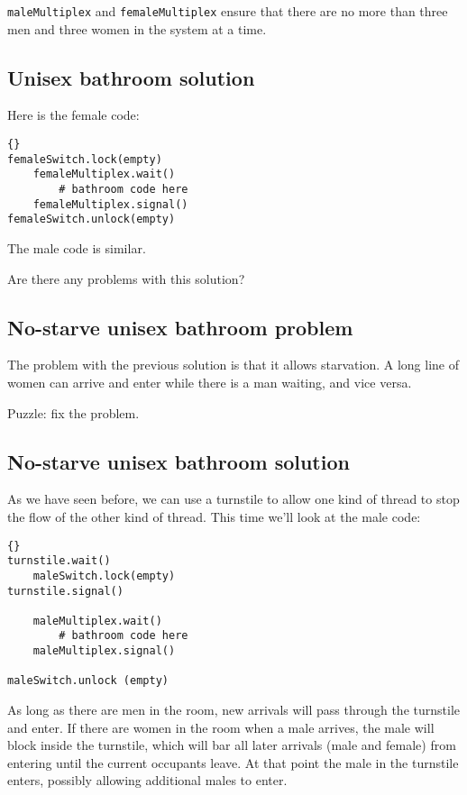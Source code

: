 \documentclass{book}
\newcommand{\clearemptydoublepage}{\newpage\cleardoublepage}
\begin{document}
{\tt maleMultiplex} and {\tt femaleMultiplex} ensure that there are no
more than three men and three women in the system at a time.


\clearemptydoublepage
\subsection {Unisex bathroom solution}

Here is the female code:

\begin{lstlisting}[title={Unisex bathroom solution (female)}]{}
femaleSwitch.lock(empty)
    femaleMultiplex.wait()
        # bathroom code here
    femaleMultiplex.signal()
femaleSwitch.unlock(empty)
\end{lstlisting}

The male code is similar.

Are there any problems with this solution?

\clearemptydoublepage
\subsection {No-starve unisex bathroom problem}

The problem with the previous solution is that it allows starvation.
A long line of women can arrive and enter while there is a man
waiting, and vice versa.

Puzzle: fix the problem.


\clearemptydoublepage
\subsection {No-starve unisex bathroom solution}

As we have seen before, we can use a turnstile to allow one
kind of thread to stop the flow of the other kind of thread.
This time we'll look at the male code:

\begin{lstlisting}[title={No-starve unisex bathroom solution (male)}]{}
turnstile.wait()
    maleSwitch.lock(empty)
turnstile.signal()

    maleMultiplex.wait()
        # bathroom code here
    maleMultiplex.signal()

maleSwitch.unlock (empty)
\end{lstlisting}

As long as there are men in the room, new arrivals will pass
through the turnstile and enter.  If there are women in the room
when a male arrives, the male will block inside the turnstile,
which will bar all later arrivals (male and female) from entering
until the current occupants leave.  At that point the male in
the turnstile enters, possibly allowing additional males to enter.
\end{document}
